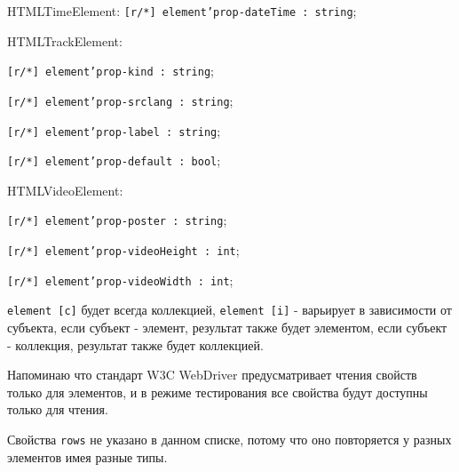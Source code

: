 \begin{icItems}
	\item HTMLTimeElement: \texttt{[r/*] element'prop-dateTime : string};
	
	\item HTMLTrackElement:
	\begin{icItems}
		\item \texttt{[r/*] element'prop-kind : string};
		\item \texttt{[r/*] element'prop-srclang : string};
		\item \texttt{[r/*] element'prop-label : string};
		\item \texttt{[r/*] element'prop-default : bool};
	\end{icItems}
	
	\item HTMLVideoElement:
	\begin{icItems}
		\item \texttt{[r/*] element'prop-poster : string};
		\item \texttt{[r/*] element'prop-videoHeight : int};
		\item \texttt{[r/*] element'prop-videoWidth : int};
	\end{icItems}
	
\end{icItems}

\texttt{element [c]} будет всегда коллекцией, \texttt{element [i]} - варьирует в зависимости от субъекта, если субъект - элемент, результат также будет элементом, если субъект - коллекция, результат также будет коллекцией. 

Напоминаю что стандарт W3C WebDriver предусматривает чтения свойств только для элементов, и в режиме тестирования все свойства будут доступны только для чтения.

Свойства \texttt{rows} не указано в данном списке, потому что оно повторяется у разных элементов имея разные типы.

